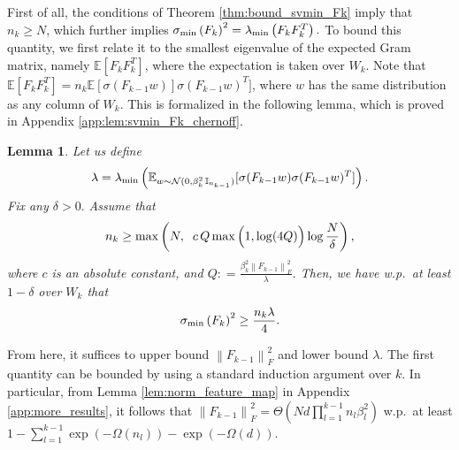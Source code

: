 \documentclass[11pt]{article}
\newcommand{\E}{\mathbb{E}}
\newcommand{\distas}[1]{\mathbin{\overset{#1}{\sim}}}
\newtheorem{lemma}[theorem]{Lemma}
\newcommand{\Id}{\mathbb{I}}
\newcommand{\bigOmg}[1]{\Omega\left(#1\right)}
\newcommand{\bigTheta}[1]{\Theta\left(#1\right)}
\newcommand{\bigexp}[1]{\exp\left(#1\right)}
\newcommand{\norm}[1]{\left\|#1\right\|}
\newcommand{\svmin}[1]{\sigma_{\rm min}\left(#1\right)}
\newcommand{\evmin}[1]{\lambda_{\rm min}\left(#1\right)}
\def\bydef{\mathrel{\mathop:}=}
\def\max{\mathop{\rm max}\nolimits}
\begin{document}
First of all, the conditions of Theorem \ref{thm:bound_svmin_Fk} imply that $n_k\geq N$,
which further implies $\svmin{F_k}^2=\evmin{F_kF_k^T}.$
To bound this quantity, we first relate it to the smallest eigenvalue of the expected Gram matrix, 
namely $\E[F_kF_k^T]$, where the expectation is taken over $W_k.$
Note that $\E[F_kF_k^T]=n_k\E[\sigma(F_{k-1}w)]\sigma(F_{k-1}w)^T]$, where $w$ has the same distribution as any column of $W_k.$ 
This is formalized in the following lemma, which is proved in Appendix \ref{app:lem:svmin_Fk_chernoff}. 
\begin{lemma}\label{lem:svmin_Fk_chernoff}
    Let us define
    \begin{align}
	\lambda=\evmin{ \E_{w\distas{}\mathcal{N}(0,\beta_k^2\,\Id_{n_{k-1}})} [\sigma(F_{k-1}w) \sigma(F_{k-1} w)^T] }.
    \end{align}
    Fix any $\delta>0.$
    Assume that
    \begin{align*}
	n_k\geq\max\left(N,\;\; c\, Q \max\Big(1, \log(4Q)\Big) \log\frac{N}{\delta} \right) ,
    \end{align*}
    where $c$ is an absolute constant, and $Q\bydef \frac{\beta_k^2\norm{F_{k-1}}_F^2}{\lambda}.$
    Then, we have w.p.\ at least $1-\delta$ over $W_k$ that
    \begin{align*}
	\svmin{F_k}^2\geq \frac{n_k\lambda}{4} .
    \end{align*}
\end{lemma}
From here, it suffices to upper bound $\norm{F_{k-1}}_F^2$ and lower bound $\lambda.$
The first quantity can be bounded by using a standard induction argument over $k$. In particular, from Lemma \ref{lem:norm_feature_map} in Appendix \ref{app:more_results}, it follows that $\norm{F_{k-1}}_F^2=\bigTheta{N d\prod_{l=1}^{k-1} n_l \beta_l^2 }$
    w.p.\ at least $1-\sum_{l=1}^{k-1} \bigexp{-\bigOmg{n_l}} - \exp(-\bigOmg{d})$.
\end{document}
